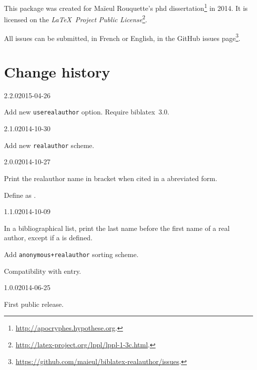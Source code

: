 \documentclass{ltxdockit}[2011/03/25]
\newcommand{\biblatex}{biblatex\xspace}
\begin{document}
This package was created for Maïeul Rouquette's phd dissertation\footnote{\url{http://apocryphes.hypothese.org}.} in 2014. It is licensed on the \emph{\LaTeX\ Project Public License}\footnote{\url{http://latex-project.org/lppl/lppl-1-3c.html}.}.


All issues can be submitted, in French or English, in the GitHub issues page\footnote{\url{https://github.com/maieul/biblatex-realauthor/issues}.}.

\section{Change history}

\begin{changelog}

  \begin{release}{2.2.0}{2015-04-26}
  \item Add new \verb|userealauthor| option. Require \biblatex~3.0. 
  \end{release}

  \begin{release}{2.1.0}{2014-10-30}
  \item Add new \verb|realauthor| scheme. 
  \end{release}


  \begin{release}{2.0.0}{2014-10-27}
  \item Print the realauthor name in bracket when cited in a abreviated form.
  \item Define  as . 
  \end{release}

\begin{release}{1.1.0}{2014-10-09}
\item In a bibliographical list, print the last name before the first name of a real author, except if a  is defined.
\item Add \verb|anonymous+realauthor| sorting scheme.   
\item Compatibility with  entry. 
\end{release}

\begin{release}{1.0.0}{2014-06-25}
\item First public release.
\end{release}
\end{changelog}
\end{document}
